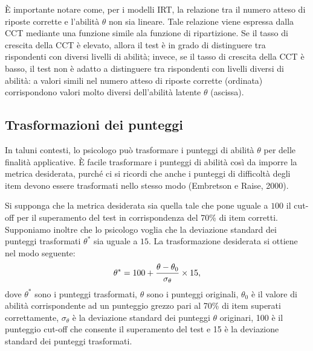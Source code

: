 È importante  notare come, per i modelli IRT, la relazione tra il numero atteso di riposte corrette e l'abilità $\theta$ non sia lineare. Tale relazione viene espressa dalla CCT mediante una funzione simile ala funzione di ripartizione. Se il tasso di crescita della CCT è elevato, allora il test è in grado di distinguere tra rispondenti con diversi livelli di abilità; invece, se il tasso di crescita della CCT è basso, il test non è adatto a distinguere tra rispondenti con livelli diversi di abilità: a valori simili nel numero atteso di riposte corrette (ordinata) corrispondono valori molto diversi dell'abilità latente $\theta$ (ascissa).  



\subsection{Trasformazioni dei punteggi}

In taluni contesti, lo psicologo può trasformare i punteggi di abilità
$\theta$ per delle finalità applicative. {\`E} facile trasformare i
punteggi di abilità così da imporre la metrica desiderata, purché ci
si ricordi che anche i punteggi di difficoltà degli item devono essere
trasformati nello stesso modo (Embretson e Raise, 2000).

Si supponga che la metrica desiderata sia quella tale che pone uguale a $100$ il cut-off per il superamento del test in corrispondenza del 70\% di item corretti. Supponiamo inoltre che lo psicologo voglia che la deviazione standard dei punteggi trasformati $\theta^*$ sia uguale a $15$. La trasformazione desiderata si ottiene nel modo seguente:
\begin{equation}
\theta^* = 100 + \frac{\theta - \theta_0}{\sigma_{\theta}}\times 15,\notag
\end{equation}
dove $\theta^*$ sono i punteggi trasformati, $\theta$ sono i punteggi
originali, $\theta_0$ è il valore di abilità corrispondente ad un
punteggio grezzo pari al  70\% di item superati correttamente,
$\sigma_{\theta}$ è la deviazione standard dei punteggi $\theta$
originari, 100 è il punteggio cut-off che consente il superamento del  test e 15 è la deviazione standard dei punteggi trasformati.


